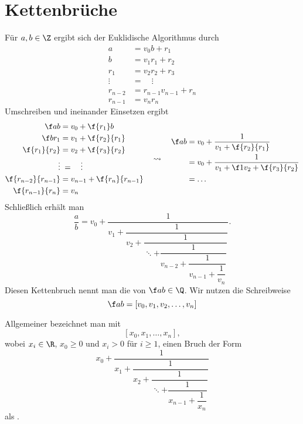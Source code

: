 \label{chap:6}
\chapter{Kettenbrüche}


\begin{ex}
	Für $a, b \in \Z$ ergibt sich der Euklidische Algorithmus durch
	\begin{align*}
		a &= v_0 b + r_1 \\
		b &= v_1 r_1 + r_2 \\
		r_1 &= v_2 r_2 + r_3 \\
		\vdots \; &= \quad \vdots \\
		r_{n-2} &= r_{n-1} v_{n-1} + r_n \\
		r_{n-1} &= v_n r_n
	\end{align*}
	Umschreiben und ineinander Einsetzen ergibt
	\begin{align*}
		\begin{aligned}
			\f ab &= v_0 + \f {r_1}b \\
			\f b{r_1} &= v_1 + \f {r_2}{r_1} \\
			\f {r_1}{r_2} &= v_2 + \f{r_3}{r_2} \\
			\vdots &\;= \quad \vdots \\
			\f {r_{n-2}}{r_{n-1}} &= v_{n-1} + \f{r_n}{r_{n-1}} \\
			\f {r_{n-1}}{r_n} &= v_n
		\end{aligned}
		\quad\leadsto\quad
		\begin{aligned}
			\f ab
			&= v_0 + \dfrac 1{v_1 + \f{r_2}{r_1}} \\
			&= v_0 + \dfrac 1{v_1 + \f 1{v_2 + \f {r_3}{r_2}}} \\
			&= \dotso
		\end{aligned}
	\end{align*}
	Schließlich erhält man
	\[
		\dfrac ab
		= v_0 + \dfrac 1{v_1 + \dfrac 1{v_2 + \dfrac 1{\ddots + \dfrac 1{v_{n-2} + \dfrac 1{v_{n-1} + \dfrac 1{v_n}}}}} }.
	\]
	Diesen Kettenbruch nennt man die  von $\f ab \in \Q$.
	Wir nutzen die Schreibweise
	\[
		\f ab = [v_0, v_1, v_2, \dotsc, v_n]
	\]

	Allgemeiner bezeichnet man mit
	\[
		[x_0, x_1, \dotsc, x_n],
	\]
	wobei $x_i \in \R$, $x_0 \ge 0$ und $x_i > 0$ für $i \ge 1$, einen Bruch der Form
	\[
		x_0 + \dfrac 1{x_1 + \dfrac 1{x_2 + \dfrac 1{\ddots + \dfrac 1{x_{n-1} + \dfrac 1{x_n}}}}}
	\]
	als .
\end{ex}


